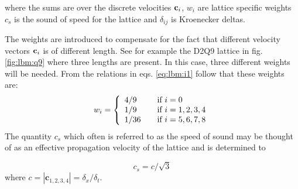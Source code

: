 
where the sums are over the discrete velocities $\mathbf{c}_i$, $w_i$ are
lattice specific weights $c_s$ is the sound of speed for the lattice
and $\delta_{ij}$ is Kroenecker deltas. 

The weights are introduced to compensate for the fact that different
velocity vectors $\mathbf{c}_i$ is of different length. See for example the
D2Q9 lattice in fig. \ref{fig:lbm:q9} where three lengths are
present. In this case, three different weights will be needed. From
the relations in eqs. \eqref{eq:lbm:i1} follow that
these weights are: 
\begin{equation}\label{eq:lbm:weights}
w_i = 
\left\{
  \begin{array}{l l}
    4/9 & \quad \text{if $i = 0$}\\ 
    1/9 & \quad \text{if $i = 1, 2, 3, 4$}\\    
    1/36 & \quad \text{if $i = 5, 6, 7, 8$}\\
  \end{array} \right.
\end{equation}
The quantity $c_s$ which often is referred to as the speed of sound
may be thought of as an effective propagation velocity of the lattice
and is determined to

\begin{equation}
c_s = c/\sqrt{3}
\end{equation} 
where $c = |\mathbf{c}_{1,2,3,4}| = \delta_x/\delta_t$.
